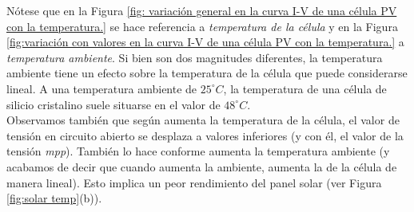 \documentclass[12pt]{article}
\begin{document}
	\noindent Nótese que en la Figura \ref{fig: variación general en la curva I-V de una célula PV con la temperatura.} se hace referencia a \textit{temperatura de la célula} y en la Figura \ref{fig:variación con valores en la curva I-V de una célula PV con la temperatura.} a \textit{temperatura ambiente}. Si bien son dos magnitudes diferentes, la temperatura ambiente tiene un efecto sobre la temperatura de la célula que puede considerarse lineal. A una temperatura ambiente de $25^{\circ}C$, la temperatura de una célula de silicio cristalino suele situarse en el valor de $48^{\circ}C$. \\
	
	\noindent Observamos también que según aumenta la temperatura de la célula, el valor de tensión en circuito abierto se desplaza a valores inferiores (y con él, el valor de la tensión \textit{mpp}). También lo hace conforme aumenta la temperatura ambiente (y acabamos de decir que cuando aumenta la ambiente, aumenta la de la célula de manera lineal). Esto implica un peor rendimiento del panel solar (ver Figura \ref{fig:solar temp}(b)).
	
\end{document}
